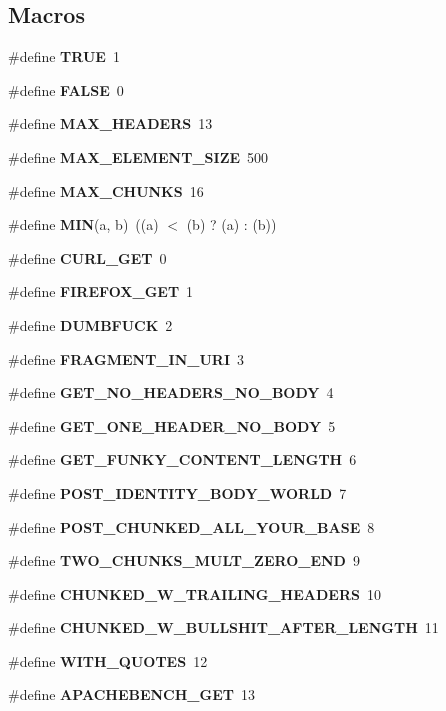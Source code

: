 \subsection*{Macros}
\begin{DoxyCompactItemize}
\item 
\#define {\bf T\+R\+UE}~1
\item 
\#define {\bf F\+A\+L\+SE}~0
\item 
\#define {\bf M\+A\+X\+\_\+\+H\+E\+A\+D\+E\+RS}~13
\item 
\#define {\bf M\+A\+X\+\_\+\+E\+L\+E\+M\+E\+N\+T\+\_\+\+S\+I\+ZE}~500
\item 
\#define {\bf M\+A\+X\+\_\+\+C\+H\+U\+N\+KS}~16
\item 
\#define {\bf M\+IN}(a,  b)~((a) $<$ (b) ? (a) \+: (b))
\item 
\#define {\bf C\+U\+R\+L\+\_\+\+G\+ET}~0
\item 
\#define {\bf F\+I\+R\+E\+F\+O\+X\+\_\+\+G\+ET}~1
\item 
\#define {\bf D\+U\+M\+B\+F\+U\+CK}~2
\item 
\#define {\bf F\+R\+A\+G\+M\+E\+N\+T\+\_\+\+I\+N\+\_\+\+U\+RI}~3
\item 
\#define {\bf G\+E\+T\+\_\+\+N\+O\+\_\+\+H\+E\+A\+D\+E\+R\+S\+\_\+\+N\+O\+\_\+\+B\+O\+DY}~4
\item 
\#define {\bf G\+E\+T\+\_\+\+O\+N\+E\+\_\+\+H\+E\+A\+D\+E\+R\+\_\+\+N\+O\+\_\+\+B\+O\+DY}~5
\item 
\#define {\bf G\+E\+T\+\_\+\+F\+U\+N\+K\+Y\+\_\+\+C\+O\+N\+T\+E\+N\+T\+\_\+\+L\+E\+N\+G\+TH}~6
\item 
\#define {\bf P\+O\+S\+T\+\_\+\+I\+D\+E\+N\+T\+I\+T\+Y\+\_\+\+B\+O\+D\+Y\+\_\+\+W\+O\+R\+LD}~7
\item 
\#define {\bf P\+O\+S\+T\+\_\+\+C\+H\+U\+N\+K\+E\+D\+\_\+\+A\+L\+L\+\_\+\+Y\+O\+U\+R\+\_\+\+B\+A\+SE}~8
\item 
\#define {\bf T\+W\+O\+\_\+\+C\+H\+U\+N\+K\+S\+\_\+\+M\+U\+L\+T\+\_\+\+Z\+E\+R\+O\+\_\+\+E\+ND}~9
\item 
\#define {\bf C\+H\+U\+N\+K\+E\+D\+\_\+\+W\+\_\+\+T\+R\+A\+I\+L\+I\+N\+G\+\_\+\+H\+E\+A\+D\+E\+RS}~10
\item 
\#define {\bf C\+H\+U\+N\+K\+E\+D\+\_\+\+W\+\_\+\+B\+U\+L\+L\+S\+H\+I\+T\+\_\+\+A\+F\+T\+E\+R\+\_\+\+L\+E\+N\+G\+TH}~11
\item 
\#define {\bf W\+I\+T\+H\+\_\+\+Q\+U\+O\+T\+ES}~12
\item 
\#define {\bf A\+P\+A\+C\+H\+E\+B\+E\+N\+C\+H\+\_\+\+G\+ET}~13
\item 

\end{DoxyCompactItemize}

